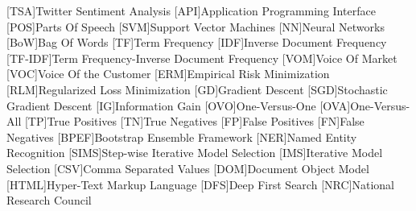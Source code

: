 \begin{acronym}
[TSA]{Twitter Sentiment Analysis}
[API]{Application Programming Interface}
[POS]{Parts Of Speech}
[SVM]{Support Vector Machines}
[NN]{Neural Networks}
[BoW]{Bag Of Words}
[TF]{Term Frequency}
[IDF]{Inverse Document Frequency}
[TF-IDF]{Term Frequency-Inverse Document Frequency}
[VOM]{Voice Of Market}
[VOC]{Voice Of the Customer}
[ERM]{Empirical Risk Minimization}
[RLM]{Regularized Loss Minimization}
[GD]{Gradient Descent}
[SGD]{Stochastic Gradient Descent}
[IG]{Information Gain}
[OVO]{One-Versus-One}
[OVA]{One-Versus-All}
[TP]{True Positives}
[TN]{True Negatives}
[FP]{False Positives}
[FN]{False Negatives}
[BPEF]{Bootstrap Ensemble Framework}
[NER]{Named Entity Recognition}
[SIMS]{Step-wise Iterative Model Selection}
[IMS]{Iterative Model Selection}
[CSV]{Comma Separated Values}
[DOM]{Document Object Model}
[HTML]{Hyper-Text Markup Language}
[DFS]{Deep First Search}
[NRC]{National Research Council}
\end{acronym}